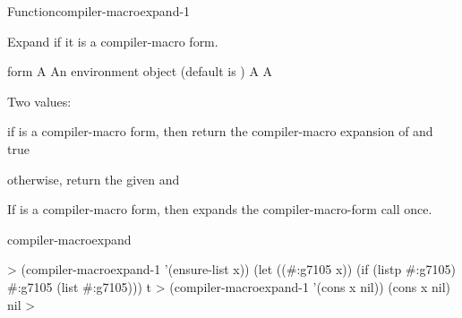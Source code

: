 \documentclass[10pt,twoside,english,pdftex]{article}
\begin{document}
\begin{functiondoc}{Function}{compiler-macroexpand-1}{%
       
    }
%
%
  
\fnsyntax

\fnpurpose Expand  if it is a compiler-macro form.

\fnpackage {}

\fnmodule {}

\fnargs
\begin{args}{form}
\arg[form] A 
\arg[env] An environment object (default is \nil)
\arg[expansion] A 
\arg[expanded-p] A 
\end{args}

\fnreturns
Two values:
\begin{tightitemize}
\item if  is a compiler-macro form, then return the compiler-macro
  expansion of  and true
\item otherwise, return the given  and \nil{}
\end{tightitemize}

\fndescription 
%
If  is a compiler-macro form, then
 expands the compiler-macro-form call
once.

\begin{alsos}{compiler-macroexpand}
\end{alsos}

\fnexamples
%
\W\supp
\begin{example}
  > (compiler-macroexpand-1 '(ensure-list x))
  (let ((#:g7105 x)) (if (listp #:g7105) #:g7105 (list #:g7105)))
  t
  > (compiler-macroexpand-1 '(cons x nil))
  (cons x nil)
  nil
  >
\end{example}

\end{functiondoc}

\end{document}
